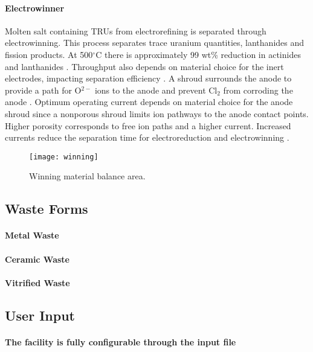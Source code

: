 \paragraph{Electrowinner}

Molten salt containing \glspl{TRU} from electrorefining is separated through electrowinning. This process separates trace uranium quantities, lanthanides and fission products. 
At 500$^{\circ}$C there is approximately 99 wt\% reduction in actinides and lanthanides \cite{flowsheet_1998}. 
Throughput also depends on material choice for the inert electrodes, impacting separation 
efficiency \cite{koyama_development_2012}. A shroud surrounds the anode to provide a path for O$^{2-}$ ions to the anode and 
prevent Cl$_2$ from corroding the anode \cite{kim_development_2013,choi_electrochemical_2015}. Optimum operating current 
depends on material choice for the anode shroud since a nonporous shroud limits ion pathways to the anode contact points.
Higher porosity corresponds to free ion paths and a higher current. Increased currents reduce the separation time for electroreduction and electrowinning \cite{choi_electrochemical_2015}.

\begin{figure} 
	\centering
	\texttt{[image: winning]}
	\caption{Winning material balance area.}
	\label{fig:winning}
\end{figure}

\subsection{Waste Forms}
\paragraph{Metal Waste}

\paragraph{Ceramic Waste}

\paragraph{Vitrified Waste}


\subsection{User Input}
\paragraph{The facility is fully configurable through the input file}

